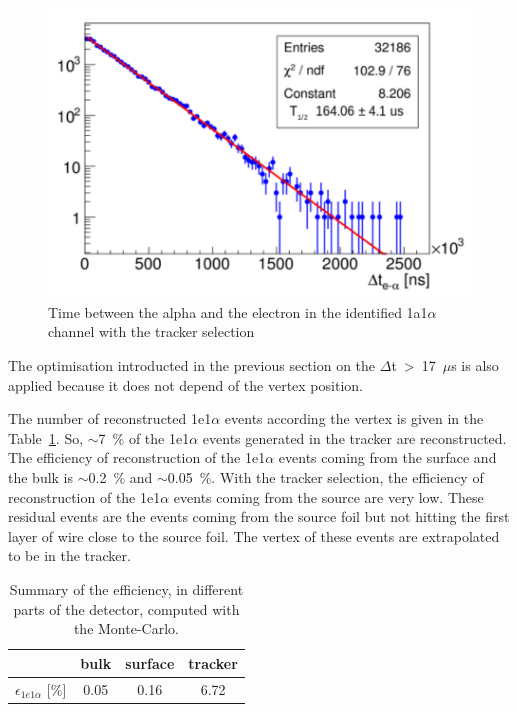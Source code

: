 \documentclass[main.tex]{subfiles}
\begin{document}
\begin{figure}[h!]
\begin{center}
\includegraphics[scale=0.6]{pictures/Chap5/delta_t_tracker_selection_tracker.pdf}
\caption{Time between the alpha and the electron in the identified 1a1$\alpha$ channel with the tracker selection}
\label{delta_t_tracker_selection}
\end{center}
\end{figure}


\bigskip


\noindent The optimisation introducted in the previous section on the $\Delta$t~>~17~$\mu$s is also applied because it does not depend of the vertex position. 


\bigskip


\noindent The number of reconstructed 1e1$\alpha$ events according the vertex is given in the Table~\ref{efficiency_different_parts_tracker}. So, $\sim$7~\% of the 1e1$\alpha$ events generated in the tracker are reconstructed. The efficiency of reconstruction of the 1e1$\alpha$ events coming from the surface and the bulk is $\sim$0.2~\% and $\sim$0.05~\%. With the tracker selection, the efficiency of reconstruction of the 1e1$\alpha$ events coming from the source are very low. These residual events are the events coming from the source foil but not hitting the first layer of wire close to the source foil. The vertex of these events are extrapolated to be in the tracker.


\begin{table}[h!]
\begin{center}
\begin{tabular}{c|c|c|c}
           & bulk   & surface & tracker \\
\hline
$\epsilon_{1e1\alpha}$ [$\%$] & 0.05 & 0.16  & 6.72 \\
\hline
\end{tabular}
\end{center}
\caption{Summary of the efficiency, in different parts of the detector, computed with the Monte-Carlo.}
\label{efficiency_different_parts_tracker}
\end{table}
\end{document}
